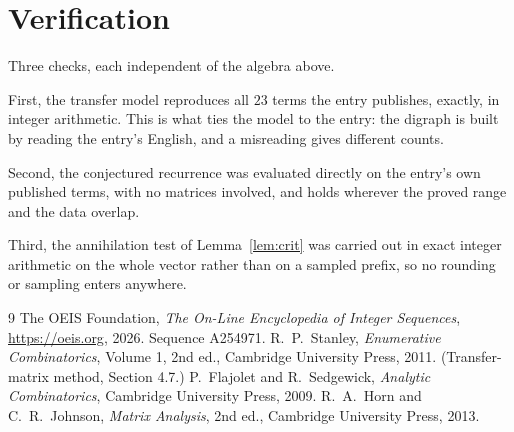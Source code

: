 \documentclass[11pt,a4paper]{article}
\theoremstyle{plain}
\theoremstyle{definition}
\begin{document}
\section{Verification}

Three checks, each independent of the algebra above.

First, the transfer model reproduces all $23$ terms the entry publishes, exactly, in
integer arithmetic. This is what ties the model to the entry: the digraph is built by reading
the entry's English, and a misreading gives different counts.

Second, the conjectured recurrence was evaluated directly on the entry's own published terms,
with no matrices involved, and holds wherever the proved range and the data overlap.

Third, the annihilation test of Lemma~\ref{lem:crit} was carried out in exact integer
arithmetic on the whole vector rather than on a sampled prefix, so no rounding or sampling
enters anywhere.

\begin{thebibliography}{9}
 The OEIS Foundation, \emph{The On-Line Encyclopedia of Integer
Sequences}, \url{https://oeis.org}, 2026. Sequence A254971.
 R.~P.~Stanley, \emph{Enumerative Combinatorics}, Volume 1, 2nd ed.,
Cambridge University Press, 2011. (Transfer-matrix method, Section 4.7.)
 P.~Flajolet and R.~Sedgewick, \emph{Analytic Combinatorics}, Cambridge
University Press, 2009.
 R.~A.~Horn and C.~R.~Johnson, \emph{Matrix Analysis}, 2nd ed., Cambridge
University Press, 2013.
\end{thebibliography}
\end{document}
